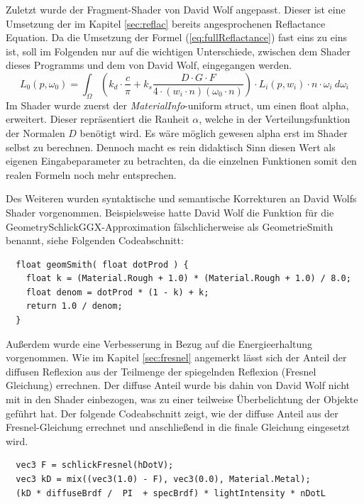 \documentclass[
  11pt,
  a4paper,
  oneside
  ]{article}
\begin{document}
Zuletzt wurde der Fragment-Shader von David Wolf angepasst. Dieser ist eine Umsetzung der im Kapitel \ref{sec:reflac} bereits angesprochenen Reflactance Equation. Da die Umsetzung der Formel (\ref{eq:fullReflactance}) fast eins zu eins ist, soll im Folgenden nur auf die wichtigen Unterschiede, zwischen dem Shader dieses Programms und dem von David Wolf, eingegangen werden. 
\begin{equation}\label{eq:fullReflactance}
  L_{0}\left( p,\omega _{0}\right) =\int _{\Omega }^{}\left( k_{d}\cdot \dfrac{c}{\pi }+k_{s}\dfrac{D\cdot G\cdot F}{4\cdot \left( w_{i}\cdot n\right) \left( \omega _{0}\cdot n\right) }\right) \cdot L_{i}\left( p,w_{i}\right) \cdot n\cdot \omega _{i} \ d\omega _{i}
\end{equation} 
Im Shader wurde zuerst der \textit{MaterialInfo}-uniform struct, um einen float alpha, erweitert. Dieser repräsentiert die Rauheit $\alpha$, welche in der Verteilungsfunktion der Normalen $D$ benötigt wird. Es wäre möglich gewesen alpha erst im Shader selbst zu berechnen. Dennoch macht es rein didaktisch Sinn diesen Wert als eigenen Eingabeparameter zu betrachten, da die einzelnen Funktionen somit den realen Formeln noch mehr entsprechen. 

Des Weiteren wurden syntaktische und semantische Korrekturen an David Wolfs Shader vorgenommen. Beispielsweise hatte David Wolf die Funktion für die Geometry\-SchlickGGX-Approximation fälschlicherweise als GeometrieSmith benannt, siehe Folgenden Codeabschnitt:
\begin{lstlisting}
  float geomSmith( float dotProd ) {
    float k = (Material.Rough + 1.0) * (Material.Rough + 1.0) / 8.0;
    float denom = dotProd * (1 - k) + k;
    return 1.0 / denom;
  }
\end{lstlisting}

Außerdem wurde eine Verbesserung in Bezug auf die Energieerhaltung vorgenommen. Wie im Kapitel \ref{sec:fresnel} angemerkt lässt sich der Anteil der diffusen Reflexion aus der Teilmenge der spiegelnden Reflexion (Fresnel Gleichung) errechnen. Der diffuse Anteil wurde bis dahin von David Wolf nicht mit in den Shader einbezogen, was zu einer teilweise Überbelichtung der Objekte geführt hat. Der folgende Codeabschnitt zeigt, wie der diffuse Anteil aus der Fresnel-Gleichung errechnet und anschließend in die finale Gleichung eingesetzt wird.
\begin{lstlisting}
  vec3 F = schlickFresnel(hDotV);         
  vec3 kD = mix((vec3(1.0) - F), vec3(0.0), Material.Metal);
  (kD * diffuseBrdf /  PI  + specBrdf) * lightIntensity * nDotL
\end{lstlisting}


















\end{document}
